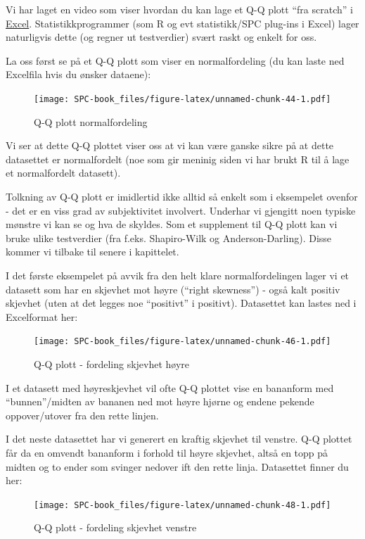 \documentclass[
]{book}
\begin{document}
Vi har laget en video som viser hvordan du kan lage et Q-Q plott ``fra scratch'' i \href{https://vimeo.com/625625741}{Excel}. Statistikkprogrammer (som R og evt statistikk/SPC plug-ins i Excel) lager naturligvis dette (og regner ut testverdier) svært raskt og enkelt for oss.

La oss først se på et Q-Q plott som viser en normalfordeling (du kan laste ned Excelfila hvis du ønsker dataene):

\begin{figure}
\centering
\texttt{[image: SPC-book\_files/figure-latex/unnamed-chunk-44-1.pdf]}
\caption{\label{fig:unnamed-chunk-44}Q-Q plott normalfordeling}
\end{figure}

Vi ser at dette Q-Q plottet viser oss at vi kan være ganske sikre på at dette datasettet er normalfordelt (noe som gir meninig siden vi har brukt R til å lage et normalfordelt datasett).

Tolkning av Q-Q plott er imidlertid ikke alltid så enkelt som i eksempelet ovenfor - det er en viss grad av subjektivitet involvert. Underhar vi gjengitt noen typiske mønstre vi kan se og hva de skyldes. Som et supplement til Q-Q plott kan vi bruke ulike testverdier (fra f.eks. Shapiro-Wilk og Anderson-Darling). Disse kommer vi tilbake til senere i kapittelet.

I det første eksempelet på avvik fra den helt klare normalfordelingen lager vi et datasett som har en skjevhet mot høyre (``right skewness'') - også kalt positiv skjevhet (uten at det legges noe ``positivt'' i positivt). Datasettet kan lastes ned i Excelformat her:

\begin{figure}
\centering
\texttt{[image: SPC-book\_files/figure-latex/unnamed-chunk-46-1.pdf]}
\caption{\label{fig:unnamed-chunk-46}Q-Q plott - fordeling skjevhet høyre}
\end{figure}

I et datasett med høyreskjevhet vil ofte Q-Q plottet vise en bananform med ``bunnen''/midten av bananen ned mot høyre hjørne og endene pekende oppover/utover fra den rette linjen.

I det neste datasettet har vi generert en kraftig skjevhet til venstre. Q-Q plottet får da en omvendt bananform i forhold til høyre skjevhet, altså en topp på midten og to ender som svinger nedover ift den rette linja. Datasettet finner du her:

\begin{figure}
\centering
\texttt{[image: SPC-book\_files/figure-latex/unnamed-chunk-48-1.pdf]}
\caption{\label{fig:unnamed-chunk-48}Q-Q plott - fordeling skjevhet venstre}
\end{figure}
\end{document}
